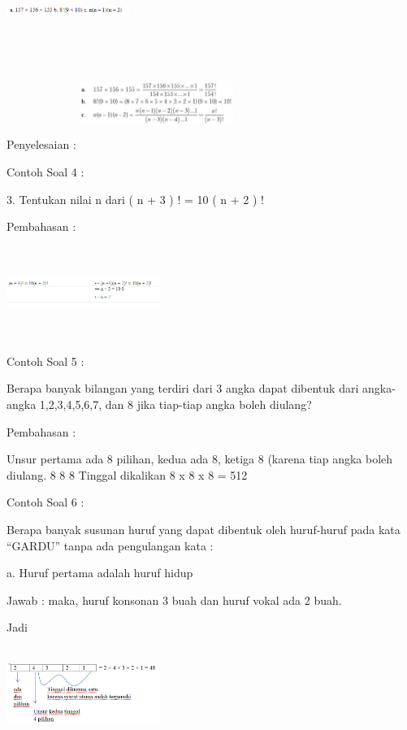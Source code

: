 \documentclass[11pt,fleqn]{book} %
\begin{document}
\includegraphics[width = 4cm, height= 2cm]{Pictures/gen5.png}

Penyelesaian :
\includegraphics[width = 5cm, height=3cm]{Pictures/gen4.png}

Contoh Soal 4 :

3. Tentukan nilai n dari ( n + 3 ) ! = 10 ( n + 2 ) !

Pembahasan :


\includegraphics[width = 5cm, height= 3cm]{Pictures/gen6.png}


Contoh Soal 5 :

Berapa banyak bilangan yang terdiri dari
3 angka dapat dibentuk dari angka-angka 1,2,3,4,5,6,7, dan 8 jika tiap-tiap angka boleh diulang?

Pembahasan :

Unsur pertama ada 8 pilihan, kedua ada 8, ketiga 8 (karena tiap angka boleh diulang.
                                    8          8          8                      
                                    Tinggal dikalikan
                                                                                    8 x 8 x 8 = 512

Contoh Soal 6 :

Berapa banyak susunan huruf yang dapat dibentuk oleh huruf-huruf pada kata “GARDU” tanpa ada pengulangan kata :

a.  Huruf pertama adalah huruf hidup

Jawab : maka, huruf konsonan 3 buah dan huruf vokal ada 2 buah. 

Jadi

\includegraphics[width = 5cm, height=3cm]{Pictures/soalkaidah1.png}
\end{document}
